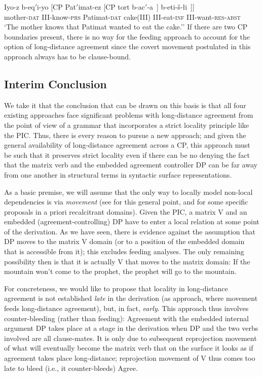 \documentclass[output=paper
,modfonts
,nonflat]{langsci/langscibook}
\begin{document}
\ea \label{ex:mueller:22}\label{tsa2}
\gll Iyo-z b-eq$'$i-yo [CP Pat$'$imat-ez [CP tort  b-ac$'$-a~] b-eti-\v{s}-\l i~]]\\
mother-{\scshape dat} III-know-{\scshape prs} {} Patimat-{\scshape dat} {} cake(III) III-eat-{\scshape inf} III-want-{\scshape res}-{\scshape abst}\\
\glt `The mother knows that Patimat wanted to eat the cake.''
\z
If there are two CP boundaries present, there is no way for the feeding approach
to account for the option of long-distance agreement since the covert
movement postulated in this approach always has to be
clause-bound.

\subsection{Interim Conclusion}

We take it that the conclusion that can be drawn on this basis is that
all four existing approaches face significant problems with
long-distance agreement from the point of view of a grammar that
incorporates a strict locality principle like the PIC. Thus, there is
every reason to pursue a  new approach; and given the general
availability of long-distance agreement across a CP, this approach
must be such that it preserves strict locality even if there can be no
denying the fact that the matrix verb and the embedded agreement
controller DP can be far away from one another in structural terms in
syntactic surface representations. 

As a basic premise, we will assume that the only way to locally model
non-local dependencies is via {\itshape movement} (see
\cite{Hornstein:01,Hornstein:09} for this general point, and
\cite{Mueller:14:buf} for some specific proposals in a priori
recalcitrant domains). Given the PIC, a matrix V and an embedded
(agreement-controlling) DP have to enter a local relation at some
point of the derivation. As we have seen, there is evidence against
the assumption that DP moves to the matrix V domain (or to a position
of the embedded domain that is accessible from it); this excludes feeding
analyses. The only remaining possibility then is that it is actually
V that moves to the matrix domain: If the mountain won't come to the
prophet, the prophet will go to the mountain.

For concreteness, we would like to propose that locality in
long-distance agreement is not established {\itshape late} in the
derivation (as  approach, where
movement feeds long-distance agreement), but, in fact, {\it
  early}. This approach thus involves counter-bleeding (rather than
feeding): Agreement with the embedded internal argument DP takes place
at a stage in the derivation when DP and the two verbs involved are
all clause-mates. It is only due to subsequent reprojection movement
of what will eventually become the matrix verb 
 that on the surface it looks as if agreement takes place
long-distance; reprojection movement of V thus comes too late to bleed
(i.e., it counter-bleeds) Agree.
\end{document}
